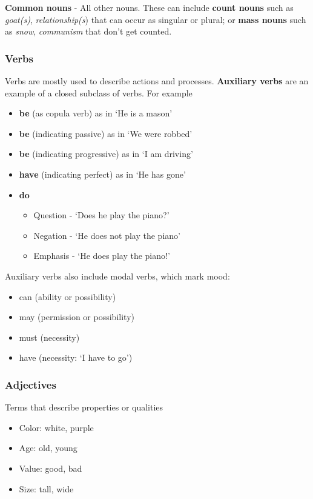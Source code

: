 \documentclass[Report.tex]{subfiles}
\begin{document}
\textbf{Common nouns} - All other nouns. These can include \textbf{count nouns}
such as \textit{goat(s)}, \textit{relationship(s}) that can occur as 
singular or plural; or \textbf{mass nouns} such as \textit{snow},
\textit{communism} that don't get counted.

\subsubsection{Verbs}
Verbs are mostly used to describe actions and processes. \textbf{Auxiliary verbs}
are an example of a closed subclass of verbs. For example
\begin{itemize}
\item \textbf{be} (as copula verb) as in `He is a mason'
\item \textbf{be} (indicating passive) as in `We were robbed'
\item \textbf{be} (indicating progressive) as in `I am driving'
\item \textbf{have} (indicating perfect) as in `He has gone'
\item \textbf{do}
\begin{itemize}
\item Question - `Does he play the piano?'
\item Negation - `He does not play the piano'
\item Emphasis - `He does play the piano!'
\end{itemize}
\end{itemize}
Auxiliary verbs also include modal verbs, which mark mood:
\begin{itemize}
\item can (ability or possibility)
\item may (permission or possibility)
\item must (necessity)
\item have (necessity: `I have to go')
\end{itemize}

\subsubsection{Adjectives}
Terms that describe properties or qualities
\begin{itemize}
\item Color: white, purple
\item Age: old, young
\item Value: good, bad
\item Size: tall, wide
\end{itemize}
\end{document}
